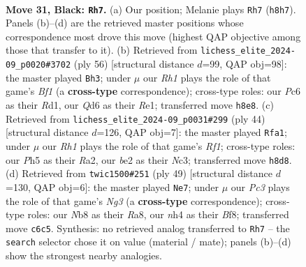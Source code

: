 \documentclass[11pt]{article}
\begin{document}
\clearpage

\begin{figure}[p]\centering
\begin{subfigure}{0.46\textwidth}\centering
\resizebox{\linewidth}{!}{%
\newchessgame
\chessboard[
  setfen={1nb4r/rp4k1/2pqp3/p2p1p1p/Pn1P1P1N/2N3P1/1PPQB1KP/4R2R b - - 16 31},
  showmover=false,
  pgfstyle=straightmove, color=movearrow, markmove={h8-h7}
]}
\caption{}
\end{subfigure}\hfill
\begin{subfigure}{0.46\textwidth}\centering
\resizebox{\linewidth}{!}{%
\newchessgame
\chessboard[
  setfen={3r4/3r2k1/1pq2pp1/p1pnpn1p/4N2P/2PP2P1/1PQ2P2/3RRBK1 w - - 2 29},
  showmover=false,
  pgfstyle=straightmove, color=movearrow, markmove={f1-h3}
]}
\caption{}
\end{subfigure}
\\[4pt]
\begin{subfigure}{0.46\textwidth}\centering
\resizebox{\linewidth}{!}{%
\newchessgame
\chessboard[
  setfen={2r5/1p1qn1kp/pB1p2pb/P2Ppp2/2r1P3/2N2PP1/RP2Q2P/5RK1 w - - 3 23},
  showmover=false,
  pgfstyle=straightmove, color=movearrow, markmove={f1-a1}
]}
\caption{}
\end{subfigure}\hfill
\begin{subfigure}{0.46\textwidth}\centering
\resizebox{\linewidth}{!}{%
\newchessgame
\chessboard[
  setfen={r4bk1/1q3ppp/pprpn1n1/3NpNPP/2P3Q1/1P2P3/PB3P1K/R2R4 b - - 0 25},
  showmover=false,
  pgfstyle=straightmove, color=movearrow, markmove={g6-e7}
]}
\caption{}
\end{subfigure}
\caption{\textbf{Move 31, Black: \texttt{Rh7}.} (a) Our position; Melanie plays \texttt{Rh7} (\texttt{h8h7}). Panels (b)--(d) are the retrieved master positions whose correspondence most drove this move (highest QAP objective among those that transfer to it). (b) Retrieved from \texttt{lichess\_elite\_2024-09\_p0020\#3702} (ply 56) [structural distance $d$=99, QAP obj=98]: the master played \texttt{Bh3}; under $\mu$ our \emph{Rh1} plays the role of that game's \emph{Bf1} (a \textbf{cross-type} correspondence); cross-type roles: our \emph{P}c6 as their \emph{R}d1, our \emph{Q}d6 as their \emph{R}e1; transferred move \texttt{h8e8}. (c) Retrieved from \texttt{lichess\_elite\_2024-09\_p0031\#299} (ply 44) [structural distance $d$=126, QAP obj=7]: the master played \texttt{Rfa1}; under $\mu$ our \emph{Rh1} plays the role of that game's \emph{Rf1}; cross-type roles: our \emph{P}h5 as their \emph{R}a2, our \emph{b}e2 as their \emph{N}c3; transferred move \texttt{h8d8}. (d) Retrieved from \texttt{twic1500\#251} (ply 49) [structural distance $d$=130, QAP obj=6]: the master played \texttt{Ne7}; under $\mu$ our \emph{Pc3} plays the role of that game's \emph{Ng3} (a \textbf{cross-type} correspondence); cross-type roles: our \emph{N}b8 as their \emph{R}a8, our \emph{n}h4 as their \emph{B}f8; transferred move \texttt{c6c5}. Synthesis: no retrieved analog transferred to \texttt{Rh7} -- the \texttt{search} selector chose it on value (material / mate); panels (b)--(d) show the strongest nearby analogies.}
\label{fig:thought-m61}
\end{figure}
\end{document}
